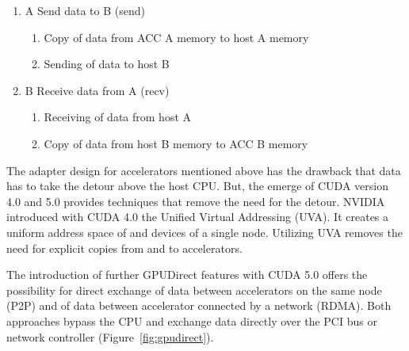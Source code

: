 \begin{enumerate}
\item A Send data to B (send)
  \begin{enumerate}
  \item Copy of data from ACC A memory to host A memory
  \item Sending of data to host B
  \end{enumerate}
\item B Receive data from A (recv)
  \begin{enumerate}
  \item Receiving of data from host A
  \item Copy of data from host B memory to ACC B memory
  \end{enumerate}
\end{enumerate}

\noindent The adapter design for accelerators mentioned above has the
drawback that data has to take the detour above the host CPU. But, the
emerge of CUDA version 4.0 and 5.0 provides techniques that remove the
need for the detour. NVIDIA introduced with CUDA 4.0 the Unified
Virtual Addressing (UVA).  It creates a uniform address space of and
devices of a single node. Utilizing UVA removes the need for explicit
copies from and to accelerators.

The introduction of further GPUDirect features with CUDA 5.0 offers
the possibility for direct exchange of data between accelerators on
the same node (P2P) and of data between accelerator connected by a
network (RDMA).  Both approaches bypass the CPU and exchange data
directly over the PCI bus or network controller
(Figure~\ref{fig:gpudirect}).

